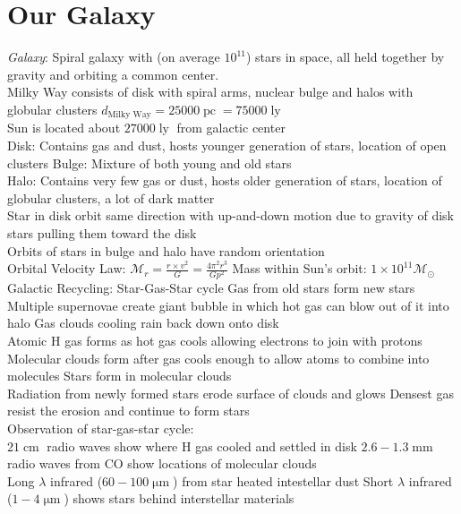 \documentclass{article}
\DeclareMathOperator{\mum}{\mu m}
\DeclareMathOperator{\mm}{mm}
\DeclareMathOperator{\cm}{cm}
\DeclareMathOperator{\ly}{ly}
\DeclareMathOperator{\pc}{pc}
\begin{document}
\section{Our Galaxy}
\textit{Galaxy}: Spiral galaxy with (on average $10^{11}$) stars in space, all held together by gravity and orbiting a common center.\\
Milky Way consists of disk with spiral arms, nuclear bulge and halos with globular clusters \quad $d_{\text{Milky Way}}=25000\pc=75000\ly$\\
Sun is located about $27000\ly$ from galactic center\\
Disk: Contains gas and dust, hosts younger generation of stars, location of open clusters \quad Bulge: Mixture of both young and old stars \\
Halo: Contains very few gas or dust, hosts older generation of stars, location of globular clusters, a lot of dark matter\\
Star in disk orbit same direction with up-and-down motion due to gravity of disk stars pulling them toward the disk\\
Orbits of stars in bulge and halo have random orientation\\
Orbital Velocity Law: $\mathcal{M}_{r}=\frac{r\times v^{2}}{G}=\frac{4\pi^{2}r^{3}}{Gp^{2}}$ \quad Mass within Sun's orbit: $1\times 10^{11}\mathcal{M}_{\odot}$\\
Galactic Recycling: Star-Gas-Star cycle \quad Gas from old stars form new stars\\
Multiple supernovae create giant bubble in which hot gas can blow out of it into halo \quad Gas clouds cooling rain back down onto disk\\
Atomic H gas forms as hot gas cools allowing electrons to join with protons\\
Molecular clouds form after gas cools enough to allow atoms to combine into molecules \quad Stars form in molecular clouds\\
Radiation from newly formed stars erode surface of clouds and glows \quad Densest gas resist the erosion and continue to form stars\\
Observation of star-gas-star cycle:\\
$21\cm$ radio waves show where H gas cooled and settled in disk \quad $2.6-1.3\mm$ radio waves from CO show locations of molecular clouds\\
Long $\lambda$ infrared ($60-100\mum$) from star heated intestellar dust \quad Short $\lambda$ infrared ($1-4\mum$) shows stars behind interstellar materials\\
\end{document}
